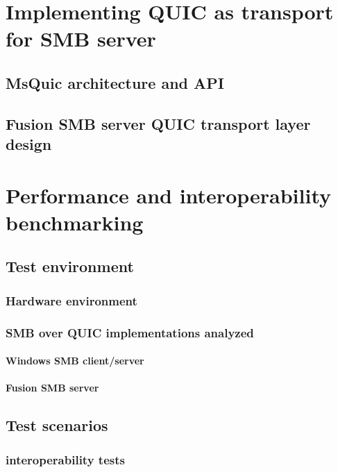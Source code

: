 \documentclass[english, 12pt, a4paper, elec, utf8, a-2b, online]{aaltothesis}
\begin{document}
\clearpage
\section{Implementing QUIC as transport for SMB server}
\label{sec:implementation}
\subsection{MsQuic architecture and API}

\subsection{Fusion SMB server QUIC transport layer design}
\clearpage
\section{Performance and interoperability benchmarking}
\label{sec:benchmark}
\subsection{Test environment}

\subsubsection{Hardware environment}

\subsubsection{SMB over QUIC implementations analyzed}

\paragraph{Windows SMB client/server}

\paragraph{Fusion SMB server}

\subsection{Test scenarios}

\subsubsection{interoperability tests}
\end{document}

